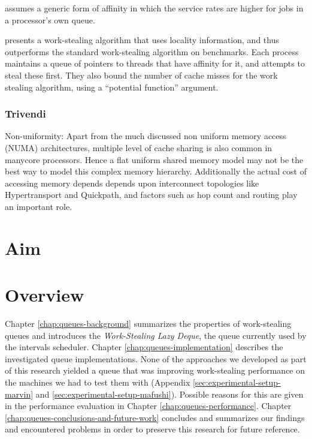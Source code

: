 \cite{Squillante2001} assumes a generic form of affinity in which the
service rates are higher for jobs in a processor's own queue.

\cite{Acar2002} presents a work-stealing algorithm that uses locality
information, and thus outperforms the standard work-stealing algorithm
on benchmarks. Each process maintains a queue of pointers to threads
that have affinity for it, and attempts to steal these first. They
also bound the number of cache misses for the work stealing algorithm,
using a ``potential function'' argument.

\subsubsection{Trivendi}

Non-uniformity: Apart from the much discussed non uniform memory
access (NUMA) architectures, multiple level of cache sharing is also
common in manycore processors. Hence a flat uniform shared memory
model may not be the best way to model this complex memory hierarchy.
Additionally the actual cost of accessing memory depends depends upon
interconnect topologies like Hypertransport and Quickpath, and factors
such as hop count and routing play an important role.

\section{Aim}
\label{sec:locality-intro-aim}


\section{Overview}
\label{sec:locality-intro-overview}

Chapter \ref{chap:queues-background} summarizes the properties of
work-stealing queues and introduces the \emph{Work-Stealing Lazy
  Deque}, the queue currently used by the intervals scheduler. Chapter
\ref{chap:queues-implementation} describes the investigated queue
implementations. None of the approaches we developed as part of this
research yielded a queue that was improving work-stealing performance
on the machines we had to test them with (Appendix
\ref{sec:experimental-setup-marvin} and
\ref{sec:experimental-setup-mafushi}). Possible reasons for this are
given in the performance evaluation in Chapter
\ref{chap:queues-performance}. Chapter
\ref{chap:queues-conclusions-and-future-work} concludes and summarizes
our findings and encountered problems in order to preserve this
research for future reference.




